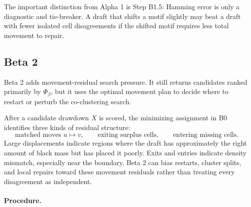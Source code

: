 \documentclass[11pt]{article}
\begin{document}
The important distinction from Alpha 1 is Step B1.5: Hamming error is only a
diagnostic and tie-breaker. A draft that shifts a motif slightly may beat a
draft with fewer isolated cell disagreements if the shifted motif requires less
total movement to repair.

\subsection{Beta 2}

Beta 2 adds movement-residual search pressure. It still returns candidates
ranked primarily by \(\Phi_\beta\), but it uses the optimal movement plan to
decide where to restart or perturb the co-clustering search.

After a candidate drawdown \(X\) is scored, the minimizing assignment in
B0 identifies three kinds of residual structure:
\[
  \text{matched moves } u\mapsto v,\qquad
  \text{exiting surplus cells},\qquad
  \text{entering missing cells}.
\]
Large displacements indicate regions where the draft has approximately the
right amount of black mass but has placed it poorly. Exits and entries indicate
density mismatch, especially near the boundary. Beta 2 can bias restarts,
cluster splits, and local repairs toward these movement residuals rather than
treating every disagreement as independent.

\paragraph{Procedure.}
\end{document}
